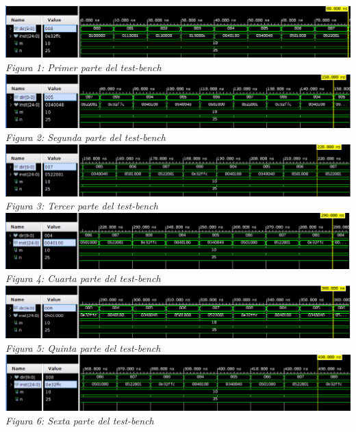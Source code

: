 \documentclass[8pt,executivepaper]{article}
\begin{document}
\begin{center}
  \includegraphics[scale=0.45]{imgs/uno.png}\\
  \textit{Figura 1: Primer parte del test-bench}\\
  \includegraphics[scale=0.45]{imgs/dos.png}\\
  \textit{Figura 2: Segunda parte del test-bench}\\
  \includegraphics[scale=0.45]{imgs/tres.png}\\
  \textit{Figura 3: Tercer parte del test-bench}\\
  \includegraphics[scale=0.45]{imgs/cuatro.png}\\
  \textit{Figura 4: Cuarta parte del test-bench}\\
  \includegraphics[scale=0.45]{imgs/cinco.png}\\
  \textit{Figura 5: Quinta parte del test-bench}\\
  \includegraphics[scale=0.45]{imgs/seis.png}\\
  \textit{Figura 6: Sexta parte del test-bench}\\

\end{center}
\end{document}
